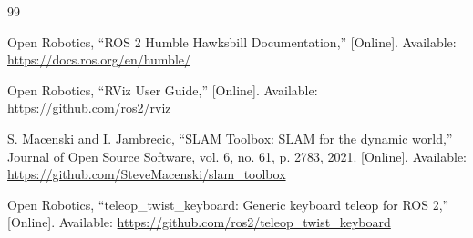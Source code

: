 \documentclass[12pt,letterpaper]{article}
\begin{document}
\begin{thebibliography}{99}

Open Robotics,
``ROS 2 Humble Hawksbill Documentation,''
[Online]. Available: \url{https://docs.ros.org/en/humble/}

Open Robotics,
``RViz User Guide,''
[Online]. Available: \url{https://github.com/ros2/rviz}

S. Macenski and I. Jambrecic,
``SLAM Toolbox: SLAM for the dynamic world,''
Journal of Open Source Software, vol. 6, no. 61, p. 2783, 2021. [Online]. Available: \url{https://github.com/SteveMacenski/slam_toolbox}

Open Robotics,
``teleop\_twist\_keyboard: Generic keyboard teleop for ROS 2,''
[Online]. Available: \url{https://github.com/ros2/teleop_twist_keyboard}

\end{thebibliography}
\end{document}
